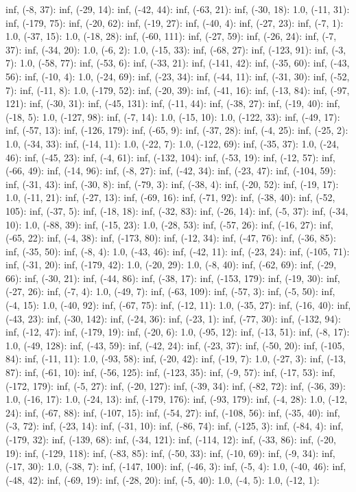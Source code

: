 \documentclass[parskip=half]{scrartcl}
\begin{document}
inf, (-8, 37): inf, (-29, 14): inf, (-42, 44): inf, (-63, 21): inf, (-30, 18): 1.0, (-11, 31): inf, (-179, 75): inf, (-20, 62): inf, (-19, 27): inf, (-40, 4): inf, (-27, 23): inf, (-7, 1): 1.0, (-37, 15): 1.0, (-18, 28): inf, (-60, 111): inf, (-27, 59): inf, (-26, 24): inf, (-7, 37): inf, (-34, 20): 1.0, (-6, 2): 1.0, (-15, 33): inf, (-68, 27): inf, (-123, 91): inf, (-3, 7): 1.0, (-58, 77): inf, (-53, 6): inf, (-33, 21): inf, (-141, 42): inf, (-35, 60): inf, (-43, 56): inf, (-10, 4): 1.0, (-24, 69): inf, (-23, 34): inf, (-44, 11): inf, (-31, 30): inf, (-52, 7): inf, (-11, 8): 1.0, (-179, 52): inf, (-20, 39): inf, (-41, 16): inf, (-13, 84): inf, (-97, 121): inf, (-30, 31): inf, (-45, 131): inf, (-11, 44): inf, (-38, 27): inf, (-19, 40): inf, (-18, 5): 1.0, (-127, 98): inf, (-7, 14): 1.0, (-15, 10): 1.0, (-122, 33): inf, (-49, 17): inf, (-57, 13): inf, (-126, 179): inf, (-65, 9): inf, (-37, 28): inf, (-4, 25): inf, (-25, 2): 1.0, (-34, 33): inf, (-14, 11): 1.0, (-22, 7): 1.0, (-122, 69): inf, (-35, 37): 1.0, (-24, 46): inf, (-45, 23): inf, (-4, 61): inf, (-132, 104): inf, (-53, 19): inf, (-12, 57): inf, (-66, 49): inf, (-14, 96): inf, (-8, 27): inf, (-42, 34): inf, (-23, 47): inf, (-104, 59): inf, (-31, 43): inf, (-30, 8): inf, (-79, 3): inf, (-38, 4): inf, (-20, 52): inf, (-19, 17): 1.0, (-11, 21): inf, (-27, 13): inf, (-69, 16): inf, (-71, 92): inf, (-38, 40): inf, (-52, 105): inf, (-37, 5): inf, (-18, 18): inf, (-32, 83): inf, (-26, 14): inf, (-5, 37): inf, (-34, 10): 1.0, (-88, 39): inf, (-15, 23): 1.0, (-28, 53): inf, (-57, 26): inf, (-16, 27): inf, (-65, 22): inf, (-4, 38): inf, (-173, 80): inf, (-12, 34): inf, (-47, 76): inf, (-36, 85): inf, (-35, 50): inf, (-8, 4): 1.0, (-43, 46): inf, (-42, 11): inf, (-23, 24): inf, (-105, 71): inf, (-31, 20): inf, (-179, 42): 1.0, (-20, 29): 1.0, (-8, 40): inf, (-62, 69): inf, (-29, 66): inf, (-30, 21): inf, (-44, 86): inf, (-38, 17): inf, (-153, 179): inf, (-19, 30): inf, (-27, 26): inf, (-7, 4): 1.0, (-49, 7): inf, (-63, 109): inf, (-57, 3): inf, (-5, 50): inf, (-4, 15): 1.0, (-40, 92): inf, (-67, 75): inf, (-12, 11): 1.0, (-35, 27): inf, (-16, 40): inf, (-43, 23): inf, (-30, 142): inf, (-24, 36): inf, (-23, 1): inf, (-77, 30): inf, (-132, 94): inf, (-12, 47): inf, (-179, 19): inf, (-20, 6): 1.0, (-95, 12): inf, (-13, 51): inf, (-8, 17): 1.0, (-49, 128): inf, (-43, 59): inf, (-42, 24): inf, (-23, 37): inf, (-50, 20): inf, (-105, 84): inf, (-11, 11): 1.0, (-93, 58): inf, (-20, 42): inf, (-19, 7): 1.0, (-27, 3): inf, (-13, 87): inf, (-61, 10): inf, (-56, 125): inf, (-123, 35): inf, (-9, 57): inf, (-17, 53): inf, (-172, 179): inf, (-5, 27): inf, (-20, 127): inf, (-39, 34): inf, (-82, 72): inf, (-36, 39): 1.0, (-16, 17): 1.0, (-24, 13): inf, (-179, 176): inf, (-93, 179): inf, (-4, 28): 1.0, (-12, 24): inf, (-67, 88): inf, (-107, 15): inf, (-54, 27): inf, (-108, 56): inf, (-35, 40): inf, (-3, 72): inf, (-23, 14): inf, (-31, 10): inf, (-86, 74): inf, (-125, 3): inf, (-84, 4): inf, (-179, 32): inf, (-139, 68): inf, (-34, 121): inf, (-114, 12): inf, (-33, 86): inf, (-20, 19): inf, (-129, 118): inf, (-83, 85): inf, (-50, 33): inf, (-10, 69): inf, (-9, 34): inf, (-17, 30): 1.0, (-38, 7): inf, (-147, 100): inf, (-46, 3): inf, (-5, 4): 1.0, (-40, 46): inf, (-48, 42): inf, (-69, 19): inf, (-28, 20): inf, (-5, 40): 1.0, (-4, 5): 1.0, (-12, 1): 
\end{document}
